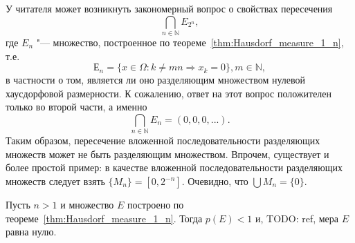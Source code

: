 \begin{remark}
	У читателя может возникнуть закономерный вопрос о свойствах пересечения
	\begin{equation}
		\bigcap_{n\in \mathbb{N}} E_{2^n}
		,
	\end{equation}
	где $E_n$ "--- множество, построенное по теореме~\ref{thm:Hausdorf_measure_1_n}, т.е.
	\begin{equation}
		Е_n = \{ x \in \Omega : k \neq mn \Rightarrow x_k = 0\}, m\in \mathbb{N}
		,
	\end{equation}
	в частности о том, является ли оно разделяющим множеством нулевой хаусдорфовой размерности.
	К сожалению, ответ на этот вопрос положителен только во второй части, а именно
	\begin{equation}
		\bigcap_{n\in \mathbb{N}} E_n = {(0,0,0,...)}
		.
	\end{equation}
	Таким образом, пересечение вложенной последовательности разделяющих множеств может не быть разделяющим множеством.
	Впрочем, существует и более простой пример:
	в качестве вложенной последовательности разделяющих множеств следует взять $\{M_n\} = [0, 2^{-n}]$.
	Очевидно, что $\bigcup\limits M_n = \{0\}$.
\end{remark}


\begin{remark}
	Пусть $n>1$ и множество $E$ построено по теореме~\ref{thm:Hausdorf_measure_1_n}.
	Тогда $p(E)< 1$ и, TODO: ref, мера $E$ равна нулю.
\end{remark}
